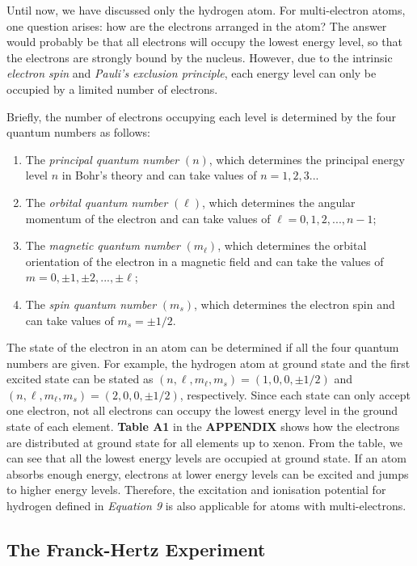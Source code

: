 \documentclass[a4paper,11pt]{article}
\begin{document}
Until now, we have discussed only the hydrogen atom. For multi-electron atoms, one question arises: how are the electrons arranged in the atom? The answer would probably be that all electrons will occupy the lowest energy level, so that the electrons are strongly bound by the nucleus. However, due to the intrinsic \textit{electron spin} and \textit{Pauli's exclusion principle}, each energy level can only be occupied by a limited number of electrons.

Briefly, the number of electrons occupying each level is determined by the four quantum numbers as follows:
\begin{enumerate}
\item The \textit{principal quantum number} $(n)$, which determines the principal energy level $n$ in Bohr's theory and can take values of $n = 1,2,3...$
\item The \textit{orbital quantum number} $(\ell)$, which determines the angular momentum of the electron and can take values of $\ell = 0,1,2,...,n - 1$;
\item The \textit{magnetic quantum number} $(m_\ell)$, which determines the orbital orientation of the electron in a magnetic field and can take the values of $m = 0,\pm1,\pm2,...,\pm\ell$;
\item The \textit{spin quantum number} $(m_s)$, which determines the electron spin and can take values of $m_s = \pm1/2$.
\end{enumerate}

The state of the electron in an atom can be determined if all the four quantum numbers are given. For example, the hydrogen atom at ground state and the first excited state can be stated as $(n,\ell,m_\ell,m_s) = (1,0,0,\pm1/2)$ and $(n,\ell,m_\ell,m_s) = (2,0,0,\pm1/2)$, respectively. Since each state can only accept one electron, not all electrons can occupy the lowest energy level in the ground state of each element. \textbf{Table A1} in the \textbf{APPENDIX} shows how the electrons are distributed at ground state for all elements up to xenon. From the table, we can see that all the lowest energy levels are occupied at ground state. If an atom absorbs enough energy, electrons at lower energy levels can be excited and jumps to higher energy levels. Therefore, the excitation and ionisation potential for hydrogen defined in \textit{Equation 9} is also applicable for atoms with multi-electrons.

\subsection*{The Franck-Hertz Experiment}
\end{document}
